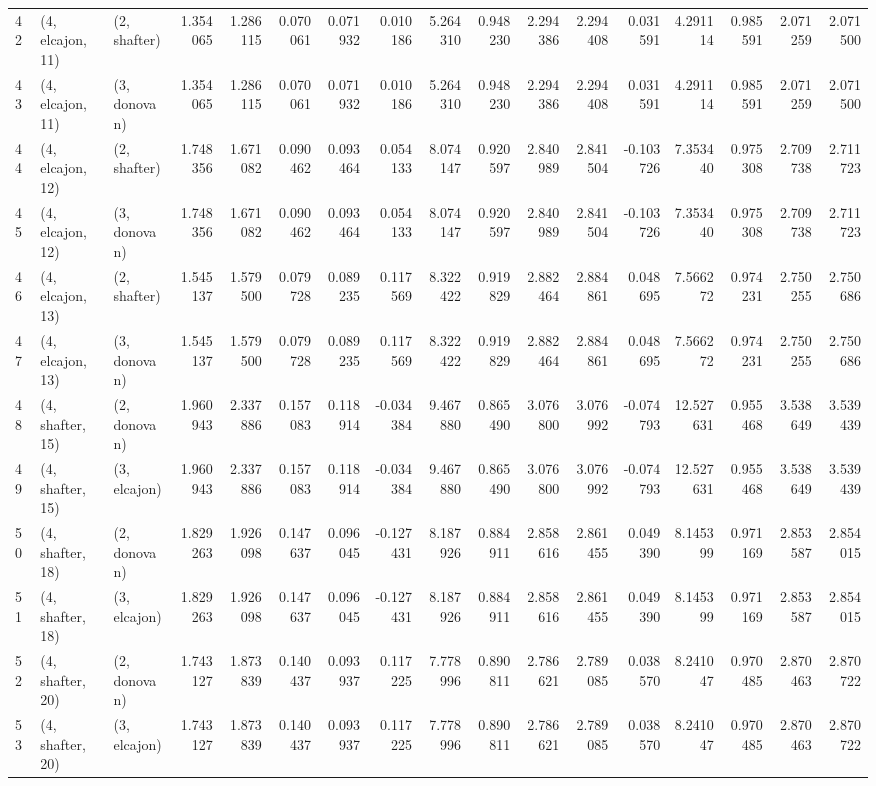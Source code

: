 \begin{tabular}{lllrrrrrrrrrrrrrr}
42 &  (4, elcajon, 11) &     (2, shafter) &  1.354065 &  1.286115 &   0.070061 &  0.071932 &  0.010186 &   5.264310 &  0.948230 &   2.294386 &  2.294408 &  0.031591 &   4.291114 &  0.985591 &  2.071259 &  2.071500 \\
43 &  (4, elcajon, 11) &     (3, donovan) &  1.354065 &  1.286115 &   0.070061 &  0.071932 &  0.010186 &   5.264310 &  0.948230 &   2.294386 &  2.294408 &  0.031591 &   4.291114 &  0.985591 &  2.071259 &  2.071500 \\
44 &  (4, elcajon, 12) &     (2, shafter) &  1.748356 &  1.671082 &   0.090462 &  0.093464 &  0.054133 &   8.074147 &  0.920597 &   2.840989 &  2.841504 & -0.103726 &   7.353440 &  0.975308 &  2.709738 &  2.711723 \\
45 &  (4, elcajon, 12) &     (3, donovan) &  1.748356 &  1.671082 &   0.090462 &  0.093464 &  0.054133 &   8.074147 &  0.920597 &   2.840989 &  2.841504 & -0.103726 &   7.353440 &  0.975308 &  2.709738 &  2.711723 \\
46 &  (4, elcajon, 13) &     (2, shafter) &  1.545137 &  1.579500 &   0.079728 &  0.089235 &  0.117569 &   8.322422 &  0.919829 &   2.882464 &  2.884861 &  0.048695 &   7.566272 &  0.974231 &  2.750255 &  2.750686 \\
47 &  (4, elcajon, 13) &     (3, donovan) &  1.545137 &  1.579500 &   0.079728 &  0.089235 &  0.117569 &   8.322422 &  0.919829 &   2.882464 &  2.884861 &  0.048695 &   7.566272 &  0.974231 &  2.750255 &  2.750686 \\
48 &  (4, shafter, 15) &     (2, donovan) &  1.960943 &  2.337886 &   0.157083 &  0.118914 & -0.034384 &   9.467880 &  0.865490 &   3.076800 &  3.076992 & -0.074793 &  12.527631 &  0.955468 &  3.538649 &  3.539439 \\
49 &  (4, shafter, 15) &     (3, elcajon) &  1.960943 &  2.337886 &   0.157083 &  0.118914 & -0.034384 &   9.467880 &  0.865490 &   3.076800 &  3.076992 & -0.074793 &  12.527631 &  0.955468 &  3.538649 &  3.539439 \\
50 &  (4, shafter, 18) &     (2, donovan) &  1.829263 &  1.926098 &   0.147637 &  0.096045 & -0.127431 &   8.187926 &  0.884911 &   2.858616 &  2.861455 &  0.049390 &   8.145399 &  0.971169 &  2.853587 &  2.854015 \\
51 &  (4, shafter, 18) &     (3, elcajon) &  1.829263 &  1.926098 &   0.147637 &  0.096045 & -0.127431 &   8.187926 &  0.884911 &   2.858616 &  2.861455 &  0.049390 &   8.145399 &  0.971169 &  2.853587 &  2.854015 \\
52 &  (4, shafter, 20) &     (2, donovan) &  1.743127 &  1.873839 &   0.140437 &  0.093937 &  0.117225 &   7.778996 &  0.890811 &   2.786621 &  2.789085 &  0.038570 &   8.241047 &  0.970485 &  2.870463 &  2.870722 \\
53 &  (4, shafter, 20) &     (3, elcajon) &  1.743127 &  1.873839 &   0.140437 &  0.093937 &  0.117225 &   7.778996 &  0.890811 &   2.786621 &  2.789085 &  0.038570 &   8.241047 &  0.970485 &  2.870463 &  2.870722 \\
\bottomrule
\end{tabular}
